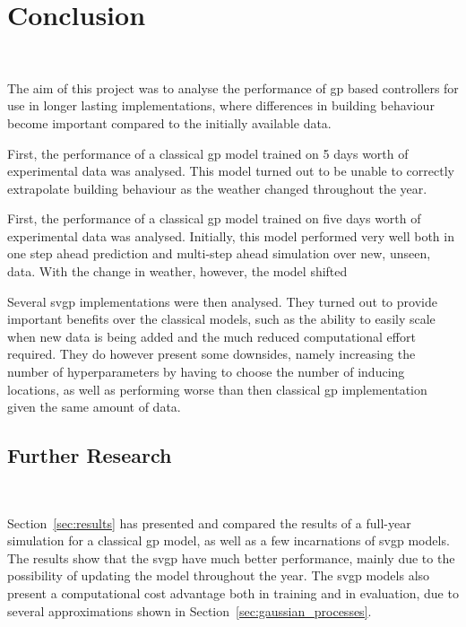 \section{Conclusion}~\label{sec:conclusion}

The aim of this project was to analyse the performance of \acrshort{gp} based
controllers for use in longer lasting implementations, where differences in
building behaviour become important compared to the initially available data.

{\color{red}
First, the performance of a classical \acrshort{gp} model trained on 5 days
worth of experimental data was analysed. This model turned out to be unable to
correctly extrapolate building behaviour as the weather changed throughout the
year.
}

First, the performance of a classical \acrshort{gp} model trained on five days
worth of experimental data was analysed. Initially, this model performed very
well both in one step ahead prediction and multi-step ahead simulation over new,
unseen, data. With the change in weather, however, the model shifted  

Several \acrshort{svgp} implementations were then analysed. They turned out to
provide important benefits over the classical models, such as the ability to
easily scale when new data is being added and the much reduced computational
effort required. They do however present some downsides, namely increasing the
number of hyperparameters by having to choose the number of inducing locations,
as well as performing worse than then classical \acrshort{gp} implementation
given the same amount of data.



\subsection{Further Research}~\label{sec:further_research}

Section~\ref{sec:results} has presented and compared the results of a full-year
simulation for a classical \acrshort{gp} model, as well as a few incarnations of
\acrshort{svgp} models. The results show that the \acrshort{svgp} have much
better performance, mainly due to the possibility of updating the model
throughout the year. The \acrshort{svgp} models also present a computational
cost advantage both in training and in evaluation, due to several approximations
shown in Section~\ref{sec:gaussian_processes}.

